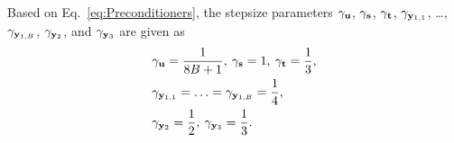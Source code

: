 \documentclass[10pt,journal]{IEEEtran}
\begin{document}
Based on Eq.~\eqref{eq:Preconditioners}, the stepsize parameters $\gamma_{\mathbf{u}}$, $\gamma_{\mathbf{s}}$, $\gamma_{\mathbf{t}}$, $\gamma_{\mathbf{y}_{1, 1}}$, \ldots, $\gamma_{\mathbf{y}_{1, B}}$, $\gamma_{\mathbf{y}_{2}}$, and $\gamma_{\mathbf{y}_{3}}$ are given as
\begin{align}
    \label{eq:stepsize_denoising}
    & \gamma_{\mathbf{u}} = \frac{1}{8 B + 1}, \: \gamma_{\mathbf{s}} = 1, \: \gamma_{\mathbf{t}} = \frac{1}{3}, \nonumber \\
    & \gamma_{\mathbf{y}_{1, 1}} = \ldots= \gamma_{\mathbf{y}_{1, B}} = \frac{1}{4}, \nonumber \\
    & \gamma_{\mathbf{y}_{2}} = \frac{1}{2}, \: \gamma_{\mathbf{y}_{3}} = \frac{1}{3}.
\end{align}
\end{document}
